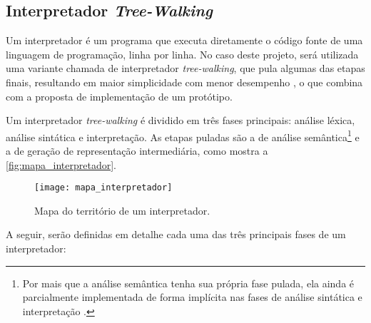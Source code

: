 \subsection{Interpretador \textit{Tree-Walking}}

Um interpretador é um programa que executa diretamente o código fonte de uma linguagem de programação, linha por linha. No caso deste projeto, será utilizada uma variante chamada de interpretador \textit{tree-walking}, que pula algumas das etapas finais, resultando em maior simplicidade com menor desempenho \cite{craftinginterpreters}, o que combina com a proposta de implementação de um protótipo.

Um interpretador \textit{tree-walking} é dividido em três fases principais: análise léxica, análise sintática e interpretação. As etapas puladas são a de análise semântica\footnote{Por mais que a análise semântica tenha sua própria fase pulada, ela ainda é parcialmente implementada de forma implícita nas fases de análise sintática e interpretação \cite{craftinginterpreters}.} e a de geração de representação intermediária, como mostra a \autoref{fig:mapa_interpretador}.

\clearpage

\begin{figure}[H]
	\centering
	\texttt{[image: mapa\_interpretador]}
	\caption{Mapa do território de um interpretador.}
	\label{fig:mapa_interpretador}
\end{figure}

A seguir, serão definidas em detalhe cada uma das três principais fases de um interpretador:

